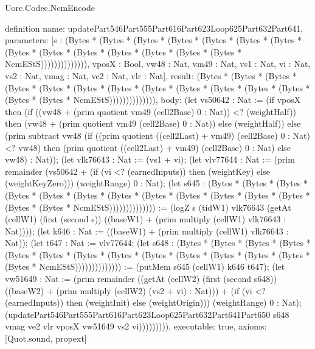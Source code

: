 \begin{lexlean}{Uorc.Codec.NcmEncode}
\begin{semanticmodule}
definition{
  name: updatePart546Part555Part616Part623Loop625Part632Part641,
  parameters: [s : (Bytes * (Bytes * (Bytes * (Bytes * (Bytes * (Bytes * (Bytes * (Bytes * (Bytes * (Bytes * (Bytes * (Bytes * (Bytes * (Bytes * NcmEStS)))))))))))))), vposX : Bool, vw48 : Nat, vm49 : Nat, vs1 : Nat, vi : Nat, vs2 : Nat, vmag : Nat, ve2 : Nat, vlr : Nat],
  result: (Bytes * (Bytes * (Bytes * (Bytes * (Bytes * (Bytes * (Bytes * (Bytes * (Bytes * (Bytes * (Bytes * (Bytes * (Bytes * (Bytes * NcmEStS)))))))))))))),
  body: (let vs50642 : Nat := (if vposX then (if ((vw48 + (prim quotient vm49 (cell2Base) 0 : Nat)) <? (weightHalf)) then (vw48 + (prim quotient vm49 (cell2Base) 0 : Nat)) else (weightHalf)) else (prim subtract vw48 (if ((prim quotient ((cell2Last) + vm49) (cell2Base) 0 : Nat) <? vw48) then (prim quotient ((cell2Last) + vm49) (cell2Base) 0 : Nat) else vw48) : Nat)); (let vlk76643 : Nat := (vs1 + vi); (let vlv77644 : Nat := (prim remainder (vs50642 + (if (vi <? (earnedInputs)) then (weightKey) else (weightKeyZero))) (weightRange) 0 : Nat); (let s645 : (Bytes * (Bytes * (Bytes * (Bytes * (Bytes * (Bytes * (Bytes * (Bytes * (Bytes * (Bytes * (Bytes * (Bytes * (Bytes * (Bytes * NcmEStS)))))))))))))) := (logZ s (tidW1) vlk76643 (getAt (cellW1) (first (second s)) ((baseW1) + (prim multiply (cellW1) vlk76643 : Nat)))); (let k646 : Nat := ((baseW1) + (prim multiply (cellW1) vlk76643 : Nat)); (let t647 : Nat := vlv77644; (let s648 : (Bytes * (Bytes * (Bytes * (Bytes * (Bytes * (Bytes * (Bytes * (Bytes * (Bytes * (Bytes * (Bytes * (Bytes * (Bytes * (Bytes * NcmEStS)))))))))))))) := (putMem s645 (cellW1) k646 t647); (let vw51649 : Nat := (prim remainder ((getAt (cellW2) (first (second s648)) ((baseW2) + (prim multiply (cellW2) (vs2 + vi) : Nat))) + (if (vi <? (earnedInputs)) then (weightInit) else (weightOrigin))) (weightRange) 0 : Nat); (updatePart546Part555Part616Part623Loop625Part632Part641Part650 s648 vmag ve2 vlr vposX vw51649 vs2 vi))))))))),
  executable: true,
  axioms: [Quot.sound, propext]
}


\end{semanticmodule}
\end{lexlean}
